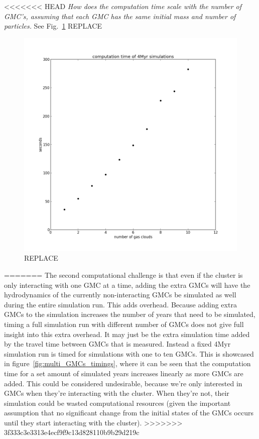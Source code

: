 \documentclass{aa}
\begin{document}
<<<<<<< HEAD
\textit{How does the computation time scale with the number of GMC's, assuming that each GMC has the same initial mass and number of particles.} See Fig.~\ref{fig:scaling} REPLACE

\begin{figure}
    \centering
    \includegraphics[width=\hsize]{img/multi_gmc_timings.png}
    \caption{REPLACE}\label{fig:scaling}
\end{figure}
=======
The second computational challenge is that even if the cluster is only interacting with one GMC at a time, adding the extra GMCs will have the hydrodynamics of the currently non-interacting GMCs be simulated as well during the entire simulation run. This adds overhead. Because adding extra GMCs to the simulation increases the number of years that need to be simulated, timing a full simulation run with different number of GMCs does not give full insight into this extra overhead. It may just be the extra simulation time added by the travel time between GMCs that is measured. Instead a fixed 4Myr simulation run is timed for simulations with one to ten GMCs. This is showcased in figure~\ref{fig:multi_GMCs_timings}, where it can be seen that the computation time for a set amount of simulated years increases linearly as more GMCs are added. This could be considered undesirable, because we're only interested in GMCs when they're interacting with the cluster. When they're not, their simulation could be wasted computational resources (given the important assumption that no significant change from the initial states of the GMCs occurs until they start interacting with the cluster).
>>>>>>> 3f333c3e3313e4ecf9f9c13d828110b9b29d219c
\end{document}
